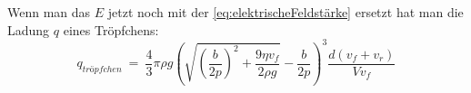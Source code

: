 \noindent Wenn man das $E$ jetzt noch mit der \autoref{eq:elektrischeFeldstärke} ersetzt hat man die Ladung $q$ eines Tröpfchens:
\begin{equation*}
	q_{tröpfchen} \ = \ \frac{4}{3} \pi \rho g \left( \sqrt{\left( \frac{b}{2p}\right)^2 + \frac{9\eta v_f}{2\rho g}} - \frac{b}{2p} \right)^3 \frac{d(v_f + v_r)}{Vv_f}
\end{equation*}







